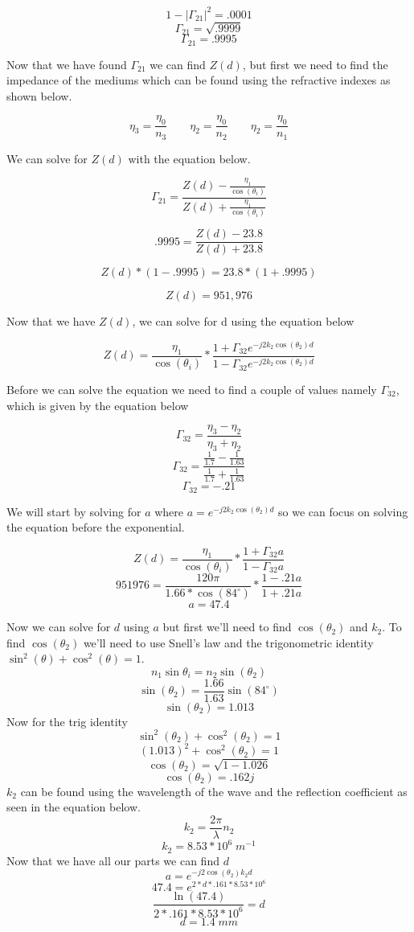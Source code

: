 \documentclass{article}
\begin{document}
\begin{enumerate}[label=(\alph*)]
\begin{enumerate}[label=(\roman*)]
    $$1 - \lvert\Gamma_{21}\rvert^{2} = .0001$$
    $$\Gamma_{21} = \sqrt{.9999}$$
    $$\Gamma_{21} = .9995$$
    
    Now that we have found $\Gamma_{21}$ we can find $Z(d)$, but first we need to find the impedance of the mediums which can be found using the refractive indexes as shown below.
    
    $$\eta_{3} = \frac{\eta_{0}}{n_{3}} \qquad\eta_{2} = \frac{\eta_{0}}{n_{2}} \qquad\eta_{2} = \frac{\eta_{0}}{n_{1}}$$
    
    We can solve for $Z(d)$ with the equation below.
    
    $$\Gamma_{21} = \frac{Z(d)-\frac{\eta_{1}}{\cos(\theta_{i})}}{Z(d)+\frac{\eta_{1}}{\cos(\theta_{i})}} $$

    $$.9995 = \frac{Z(d)-23.8}{Z(d)+23.8} $$

    $$Z(d)*(1-.9995) = 23.8*(1+.9995)$$

    $$Z(d) = 951,976$$

    Now that we have $Z(d)$, we can solve for d using the equation below

    $$Z(d) = \frac{\eta_{1}}{\cos(\theta_{i})}*\frac{1+\Gamma_{32}e^{-j2k_{2}\cos(\theta_{2})d}}{1-\Gamma_{32}e^{-j2k_{2}\cos(\theta_{2})d}} $$

    Before we can solve the equation we need to find a couple of values namely $\Gamma_{32}$, which is given by the equation below

    $$\Gamma_{32} = \frac{\eta_{3}-\eta_{2}}{\eta_{3}+\eta_{2}}$$
    $$\Gamma_{32} = \frac{\frac{1}{1.7}-\frac{1}{1.63}}{\frac{1}{1.7}+\frac{1}{1.63}}$$
    $$\Gamma_{32} = -.21$$
    
    We will start by solving for $a$ where $a = e^{-j2k_{2}\cos(\theta_{2})d}$ so we can focus on solving the equation before the exponential.

    $$Z(d) = \frac{\eta_{1}}{\cos(\theta_{i})}*\frac{1+\Gamma_{32}a}{1-\Gamma_{32}a} $$
    $$951976 = \frac{120\pi}{1.66*\cos(84^{\circ})}*\frac{1-.21a}{1+.21a}$$
    $$a = 47.4$$

    Now we can solve for $d$ using $a$ but first we'll need to find $\cos(\theta_{2})$ and $k_{2}$. To find $\cos(\theta_{2})$ we'll need to use Snell's law and the trigonometric identity $\sin^{2}(\theta) + \cos^{2}(\theta) = 1$.
    $$n_{1}\sin{\theta_{i}} = n_{2}\sin(\theta_{2})$$
    $$\sin(\theta_{2}) = \frac{1.66}{1.63}\sin(84^{\circ})$$
    $$\sin(\theta_{2}) = 1.013$$
    Now for the trig identity
    $$\sin^{2}(\theta_{2}) + \cos^{2}(\theta_{2}) = 1$$
    $$(1.013)^2 + \cos^{2}(\theta_{2}) = 1$$
    $$\cos(\theta_{2}) = \sqrt{1-1.026}$$
    $$\cos(\theta_{2}) = .162j $$
    $k_{2}$ can be found using the wavelength of the wave and the reflection coefficient as seen in the equation below.
    $$k_{2} = \frac{2\pi}{\lambda}n_{2}$$
    $$k_{2} = 8.53*10^{6}\; m^{-1}$$
    Now that we have all our parts we can find $d$
    $$a = e^{-j2\cos(\theta_{2})k_{2}d}$$
    $$47.4 = e^{2*d*.161*8.53*10^{6}}$$
    $$\frac{\ln(47.4)}{2*.161*8.53*10^6} = d$$
    $$\boxed{d = 1.4\; mm}$$
    

\end{enumerate}
\end{enumerate}
\end{document}

